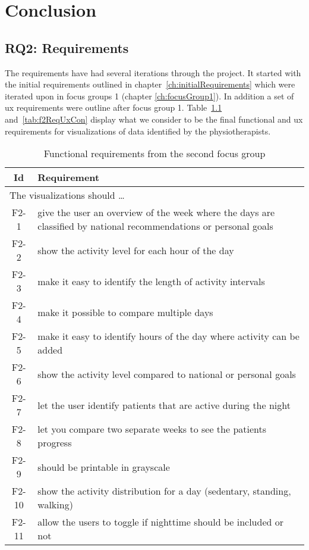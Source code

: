 \chapter{Conclusion}

\section{RQ2: Requirements}
The requirements have had several iterations through the project. It started with the initial requirements outlined in chapter~\ref{ch:initialRequirements} which were iterated upon in focus groups 1 (chapter \ref{ch:focusGroup1}). In addition a set of \gls{ux} requirements were outline after focus group 1. Table~\ref{tab:f2ReqCon} and~\ref{tab:f2ReqUxCon} display what we consider to be the final functional and \gls{ux} requirements for visualizations of data identified by the physiotherapists.
\begin{table}[h!]
  \begin{center}
  \begin{tabular}{|c|p{12cm}|}
    \hline
      \textbf{Id} & \textbf{Requirement} \\ \hline
    \multicolumn{2}{|l|}{The visualizations should \ldots} \\ \hline
      F2-1 & give the user an overview of the week where the days are classified by national recommendations or personal goals \\ \hline
      F2-2 & show the activity level for each hour of the day \\ \hline
      F2-3 & make it easy to identify the length of activity intervals \\ \hline
      F2-4 & make it possible to compare multiple days \\ \hline
      F2-5 & make it easy to identify hours of the day where activity can be added \\ \hline
      F2-6 & show the activity level compared to national or personal goals \\ \hline
      F2-7 & let the user identify patients that are active during the night \\ \hline
      F2-8 & let you compare two separate weeks to see the patients progress \\ \hline
      F2-9 & should be printable in grayscale \\ \hline
      F2-10 & show the activity distribution for a day (sedentary, standing, walking) \\ \hline
      F2-11 & allow the users to toggle if nighttime should be included or not \\ \hline
  \end{tabular}
  \end{center}
  \caption{Functional requirements from the second focus group}
  \label{tab:f2ReqCon}
\end{table}

